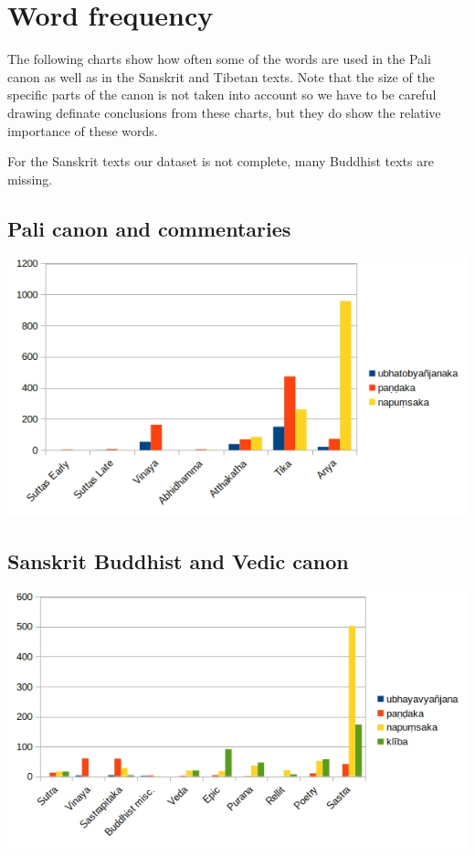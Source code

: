 \section{Word frequency}

The following charts show how often some of the words are used in the Pali canon as well as in the Sanskrit and Tibetan texts. Note that the size of the specific parts of the canon is not taken into account so we have to be careful drawing definate conclusions from these charts, but they do show the relative importance of these words. 

For the Sanskrit texts our dataset is not complete, many Buddhist texts are missing.

\subsection{Pali canon and commentaries}

\includegraphics[width=\linewidth]{pali.jpg}
\label{pali1}

\subsection{Sanskrit Buddhist and Vedic canon}

\includegraphics[width=\linewidth]{sanskrit.jpg}
\label{sanskrit1}

